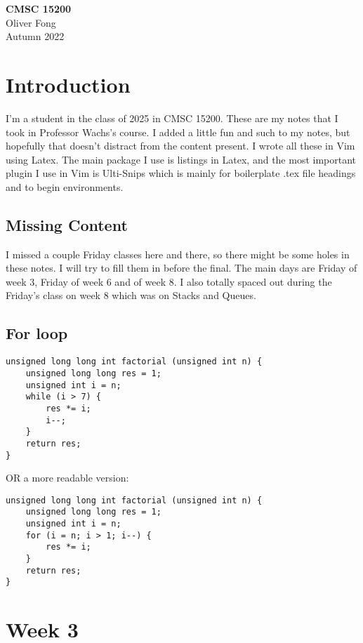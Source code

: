 \documentclass[12pt]{article}
\theoremstyle{definition}
\begin{document}
\begin{center}
{\LARGE \bf CMSC 15200}\\
{\large Oliver Fong}\\
Autumn 2022
\end{center}
\tableofcontents
\section{Introduction}
I'm a student in the class of 2025 in CMSC 15200. These are my notes that I took in Professor Wachs's course. I added a little fun and such to my notes, but hopefully that doesn't distract from the content present. I wrote all these in Vim using Latex. The main package I use is listings in Latex, and the most important plugin I use in Vim is Ulti-Snips which is mainly for boilerplate .tex file headings and to begin environments.  
\subsection{Missing Content} 
I missed a couple Friday classes here and there, so there might be some holes in these notes. I will try to fill them in before the final. The main days are Friday of week 3, Friday of week 6 and of week 8. I also totally spaced out during the Friday's class on week 8 which was on Stacks and Queues.  
\newpage
\subsection{For loop}
\begin{lstlisting}
unsigned long long int factorial (unsigned int n) {
    unsigned long long res = 1;
    unsigned int i = n;
    while (i > 7) {
        res *= i;
        i--;
    }
    return res;
}
\end{lstlisting}
OR a more readable version: 

\begin{lstlisting}
unsigned long long int factorial (unsigned int n) {
    unsigned long long res = 1;
    unsigned int i = n;
    for (i = n; i > 1; i--) {
        res *= i;
    }
    return res;
}
\end{lstlisting}
\section{Week 3}
\end{document}
